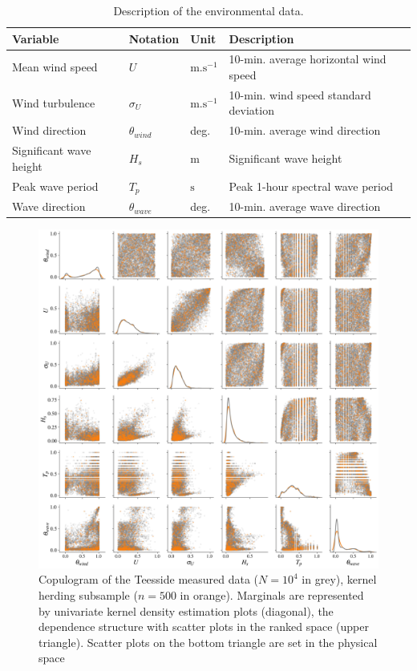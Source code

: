 \begin{table}[h] \caption{Description of the environmental data.}
\begin{center}
\begin{tabular*}{\textwidth}{@{\extracolsep\fill}llll@{}}\hline
Variable & Notation & Unit & Description\\
\hline
Mean wind speed & $U$ & $\mathrm{m.s^{-1}}$ & 10-min. average horizontal wind speed\\
Wind turbulence & $\sigma_U $ & $\mathrm{m.s^{-1}}$ & 10-min. wind speed standard deviation\\
Wind direction & $\theta_{wind} $ & deg. &  10-min. average wind direction\\
Significant wave height & $H_s $ & m & Significant wave height\\
Peak wave period & $T_p $  & $\mathrm{s}$ & Peak 1-hour spectral wave period \\
Wave direction & $\theta_{wave} $ & deg. &  10-min. average wave direction\\
\hline
\end{tabular*}
\label{tab:envi_variables}
\end{center}
\end{table}

\begin{figure}[!h]
\begin{center}
    \includegraphics[width=\linewidth]{part2/figures/DCE/teesside/pairplot_kh.jpg}    
\end{center}
\caption{Copulogram of the Teesside measured data ($N=10^4$ in grey), kernel herding subsample ($n=500$ in orange). 
Marginals are represented by univariate kernel density estimation plots (diagonal), the dependence structure with scatter plots in the ranked space (upper triangle). 
Scatter plots on the bottom triangle are set in the physical space\label{fig:envi_pairplot}}
\end{figure}

